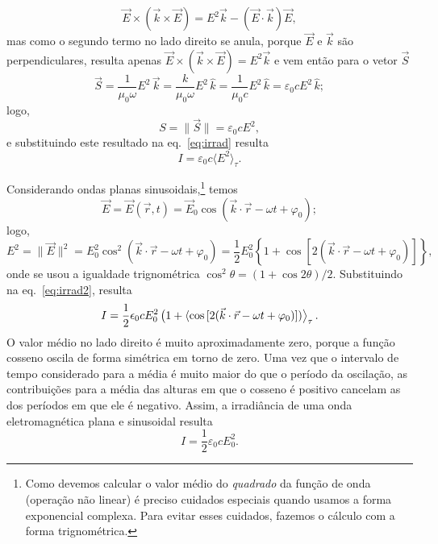 \begin{equation*}
\vec E\times(\vec k\times\vec E)=E^2\vec k - (\vec E\cdot\vec k)\vec E,
\end{equation*}
mas como o segundo termo no lado direito se anula, porque $\vec E$ e $\vec k$
são perpendiculares, resulta apenas $\vec E\times(\vec k\times\vec E)=E^2\vec k$
e vem então para o vetor $\vec S$
\begin{equation*}
\vec S=\frac{1}{\mu_0\omega}E^2\,\vec k=\frac{k}{\mu_0\omega}E^2\,\hat k
    =\frac{1}{\mu_0c}E^2\,\hat k=\varepsilon_0c E^2\,\hat k;
\end{equation*}
logo,
\begin{equation}
S=\|\vec S\|=\varepsilon_0c E^2,
\end{equation}
e substituindo este resultado na eq.~\eqref{eq:irrad} resulta
\begin{equation}\label{eq:irrad2}
I=\varepsilon_0c\langle E^2\rangle_\tau.
\end{equation}

Considerando ondas planas sinusoidais,\footnote{Como devemos calcular o valor
médio do \emph{quadrado} da função de onda (operação não linear) é preciso
cuidados especiais quando usamos a forma exponencial complexa. Para evitar esses
cuidados, fazemos o cálculo com a forma trignométrica.} temos
\begin{equation*}
\vec E=\vec E(\vec r,t)=\vec E_0
    \cos\left(\vec k\cdot \vec r-\omega t+\varphi_0\right);
\end{equation*}
logo,
\begin{equation*}
E^2=\|\vec E\|^2=E_0^2\cos^2(\vec k\cdot\vec r-\omega t+\varphi_0)
=\frac{1}{2}E_0^2\left\{1+
    \cos\left[2(\vec k\cdot\vec r-\omega t+\varphi_0)\right]\right\},
\end{equation*}
onde se usou a igualdade trignométrica $\cos^2\theta=(1+\cos2\theta)/2$.
Substituindo na eq.~\eqref{eq:irrad2}, resulta
\begin{equation}
I=\frac{1}{2}\epsilon_0 cE_0^2\left(\strut1+
    \left\langle
        \cos\left[2(\vec k\cdot\vec r-\omega t+\varphi_0)\right]\right)
    \right\rangle_\tau.
\end{equation}
O valor médio no lado direito é muito aproximadamente zero, porque a função
cosseno oscila de forma simétrica em torno de zero. Uma vez que o intervalo de
tempo considerado para a média é muito maior do que o período da oscilação, as
contribuições para a média das alturas em que o cosseno é positivo cancelam as
dos períodos em que ele é negativo. Assim, a irradiância de uma onda
eletromagnética plana e sinusoidal resulta
\begin{equation}\label{eq:plwvirrad}
I=\frac{1}{2}\varepsilon_0c E_0^2.
\end{equation}


